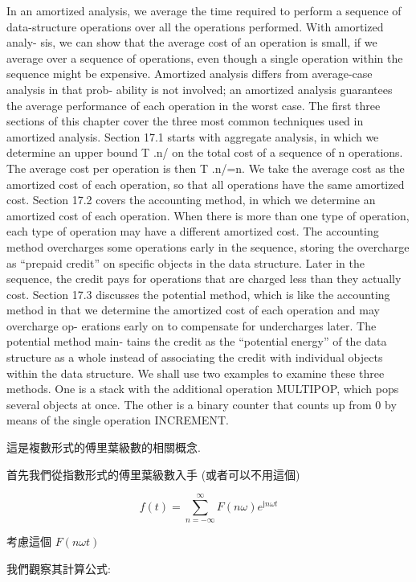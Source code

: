 \documentclass[a4paper, 10pt]{ctexbook} %
\begin{document}
\tableofcontents
In an amortized analysis, we average the time required to perform a sequence of data-structure operations over all the operations performed. With amortized analy- sis, we can show that the average cost of an operation is small, if we average over a sequence of operations, even though a single operation within the sequence might be expensive. Amortized analysis differs from average-case analysis in that prob- ability is not involved; an amortized analysis guarantees the average performance of each operation in the worst case.  The first three sections of this chapter cover the three most common techniques used in amortized analysis. Section 17.1 starts with aggregate analysis, in which we determine an upper bound T .n/ on the total cost of a sequence of n operations.  The average cost per operation is then T .n/=n. We take the average cost as the amortized cost of each operation, so that all operations have the same amortized cost.  Section 17.2 covers the accounting method, in which we determine an amortized cost of each operation. When there is more than one type of operation, each type of operation may have a different amortized cost. The accounting method overcharges some operations early in the sequence, storing the overcharge as “prepaid credit” on specific objects in the data structure. Later in the sequence, the credit pays for operations that are charged less than they actually cost.  Section 17.3 discusses the potential method, which is like the accounting method in that we determine the amortized cost of each operation and may overcharge op- erations early on to compensate for undercharges later. The potential method main- tains the credit as the “potential energy” of the data structure as a whole instead of associating the credit with individual objects within the data structure.  We shall use two examples to examine these three methods. One is a stack with the additional operation MULTIPOP, which pops several objects at once. The other is a binary counter that counts up from 0 by means of the single operation INCREMENT.  

這是複數形式的傅里葉級數的相關概念. 



首先我們從指數形式的傅里葉級數入手 (或者可以不用這個)

$$f\left(t\right) = \sum_{n  = -\infty} ^{ \infty} F \left( n \omega\right) e ^{\mathrm{j} n \omega t}$$

考慮這個 $F \left(n \omega t\right)$

我們觀察其計算公式:
\end{document}
